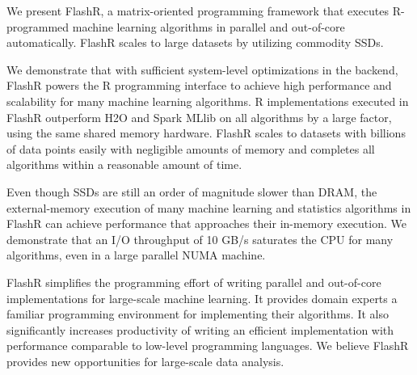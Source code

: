 We present FlashR, a matrix-oriented programming framework that executes
R-programmed machine learning algorithms in parallel and out-of-core
automatically. FlashR scales to large datasets by utilizing commodity SSDs.


We demonstrate that with sufficient system-level optimizations in the backend,
FlashR powers the R programming interface to achieve high performance and scalability
for many machine learning algorithms. R implementations executed in FlashR
outperform H2O and Spark MLlib on all algorithms by a large factor, using
the same shared memory hardware. FlashR scales to datasets with billions of
data points easily with negligible amounts of memory and completes all
algorithms within a reasonable amount of time.

Even though SSDs are still an order of magnitude slower than DRAM, the external-memory
execution of many machine learning and statistics algorithms in FlashR can achieve performance
that approaches their in-memory execution. We demonstrate that an I/O throughput
of 10 GB/s saturates the CPU for many algorithms, even in a large parallel
NUMA machine. 

FlashR simplifies the programming effort of writing
parallel and out-of-core implementations for large-scale machine learning. It
provides domain experts a familiar programming environment for implementing
their algorithms. It also significantly
increases productivity of writing an efficient implementation with performance
comparable to low-level programming languages. We believe FlashR provides
new opportunities for large-scale data analysis.

